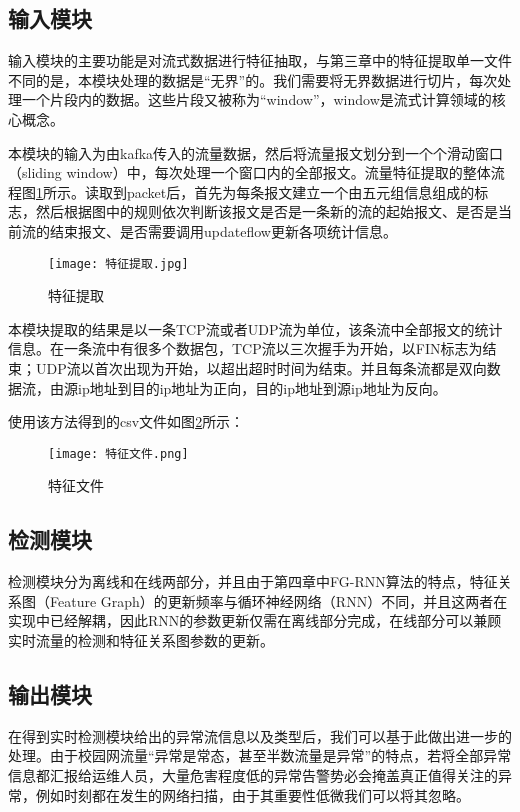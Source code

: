 \subsection{输入模块}
输入模块的主要功能是对流式数据进行特征抽取，与第三章中的特征提取单一文件不同的是，本模块处理的数据是“无界”的。我们需要将无界数据进行切片，每次处理一个片段内的数据。这些片段又被称为“window”，window是流式计算领域的核心概念。

本模块的输入为由kafka传入的流量数据，然后将流量报文划分到一个个滑动窗口（sliding window）中，每次处理一个窗口内的全部报文。流量特征提取的整体流程图\ref{fig:特征提取}所示。读取到packet后，首先为每条报文建立一个由五元组信息组成的标志，然后根据图中的规则依次判断该报文是否是一条新的流的起始报文、是否是当前流的结束报文、是否需要调用updateflow更新各项统计信息。

\begin{figure}
  \centering
  \texttt{[image: 特征提取.jpg]}
  \caption{特征提取}
  \label{fig:特征提取}
\end{figure}

本模块提取的结果是以一条TCP流或者UDP流为单位，该条流中全部报文的统计信息。在一条流中有很多个数据包，TCP流以三次握手为开始，以FIN标志为结束；UDP流以首次出现为开始，以超出超时时间为结束。并且每条流都是双向数据流，由源ip地址到目的ip地址为正向，目的ip地址到源ip地址为反向。

使用该方法得到的csv文件如图\ref{fig:特征文件}所示：
\begin{figure}
    \centering
    \texttt{[image: 特征文件.png]}
    \caption{特征文件}
    \label{fig:特征文件}
  \end{figure}


\subsection{检测模块}
检测模块分为离线和在线两部分，并且由于第四章中FG-RNN算法的特点，特征关系图（Feature Graph）的更新频率与循环神经网络（RNN）不同，并且这两者在实现中已经解耦，因此RNN的参数更新仅需在离线部分完成，在线部分可以兼顾实时流量的检测和特征关系图参数的更新。

\subsection{输出模块}
在得到实时检测模块给出的异常流信息以及类型后，我们可以基于此做出进一步的处理。由于校园网流量“异常是常态，甚至半数流量是异常”的特点，若将全部异常信息都汇报给运维人员，大量危害程度低的异常告警势必会掩盖真正值得关注的异常，例如时刻都在发生的网络扫描，由于其重要性低微我们可以将其忽略。

